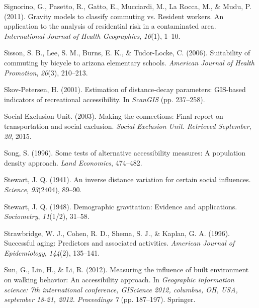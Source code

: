 \documentclass[
11pt, %
oneside, %
english, %
singlespacing, %
]{macthesis} %
\newlength{\cslhangindent}
\newenvironment{CSLReferences}[2] %
 {%
  \setlength{\parindent}{0pt}
  \ifodd #1 \everypar{\setlength{\hangindent}{\cslhangindent}}\ignorespaces\fi
  \ifnum #2 > 0
  \setlength{\parskip}{#2\baselineskip}
  \fi
 }%
 {}
\begin{document}
\begin{CSLReferences}{1}{0}
\leavevmode{}%
Signorino, G., Pasetto, R., Gatto, E., Mucciardi, M., La Rocca, M., \& Mudu, P. (2011). Gravity models to classify commuting vs. Resident workers. An application to the analysis of residential risk in a contaminated area. \emph{International Journal of Health Geographics}, \emph{10}(1), 1--10.

\leavevmode{}%
Sisson, S. B., Lee, S. M., Burns, E. K., \& Tudor-Locke, C. (2006). Suitability of commuting by bicycle to arizona elementary schools. \emph{American Journal of Health Promotion}, \emph{20}(3), 210--213.

\leavevmode{}%
Skov-Petersen, H. (2001). Estimation of distance-decay parameters: GIS-based indicators of recreational accessibility. In \emph{ScanGIS} (pp. 237--258).

\leavevmode{}%
Social Exclusion Unit. (2003). Making the connections: Final report on transportation and social exclusion. \emph{Social Exclusion Unit. Retrieved September}, \emph{20}, 2015.

\leavevmode{}%
Song, S. (1996). Some tests of alternative accessibility measures: A population density approach. \emph{Land Economics}, 474--482.

\leavevmode{}%
Stewart, J. Q. (1941). An inverse distance variation for certain social influences. \emph{Science}, \emph{93}(2404), 89--90.

\leavevmode{}%
Stewart, J. Q. (1948). Demographic gravitation: Evidence and applications. \emph{Sociometry}, \emph{11}(1/2), 31--58.

\leavevmode{}%
Strawbridge, W. J., Cohen, R. D., Shema, S. J., \& Kaplan, G. A. (1996). Successful aging: Predictors and associated activities. \emph{American Journal of Epidemiology}, \emph{144}(2), 135--141.

\leavevmode{}%
Sun, G., Lin, H., \& Li, R. (2012). Measuring the influence of built environment on walking behavior: An accessibility approach. In \emph{Geographic information science: 7th international conference, GIScience 2012, columbus, OH, USA, september 18-21, 2012. Proceedings 7} (pp. 187--197). Springer.


\end{CSLReferences}
\end{document}
